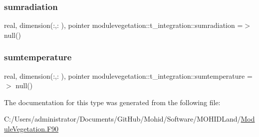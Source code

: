 \subsubsection{\texorpdfstring{sumradiation}{sumradiation}}
{\footnotesize\ttfamily real, dimension(\+:,\+:  ), pointer modulevegetation\+::t\+\_\+integration\+::sumradiation =$>$ null()\hspace{0.3cm}{\ttfamily [private]}}

\mbox{\label{structmodulevegetation_1_1t__integration_a7411474187f1475ac68e7477d77cad1e}} 
\subsubsection{\texorpdfstring{sumtemperature}{sumtemperature}}
{\footnotesize\ttfamily real, dimension(\+:,\+:  ), pointer modulevegetation\+::t\+\_\+integration\+::sumtemperature =$>$ null()\hspace{0.3cm}{\ttfamily [private]}}



The documentation for this type was generated from the following file\+:\begin{DoxyCompactItemize}
\item 
C\+:/\+Users/administrator/\+Documents/\+Git\+Hub/\+Mohid/\+Software/\+M\+O\+H\+I\+D\+Land/\mbox{\hyperlink{_module_vegetation_8_f90}{Module\+Vegetation.\+F90}}\end{DoxyCompactItemize}
